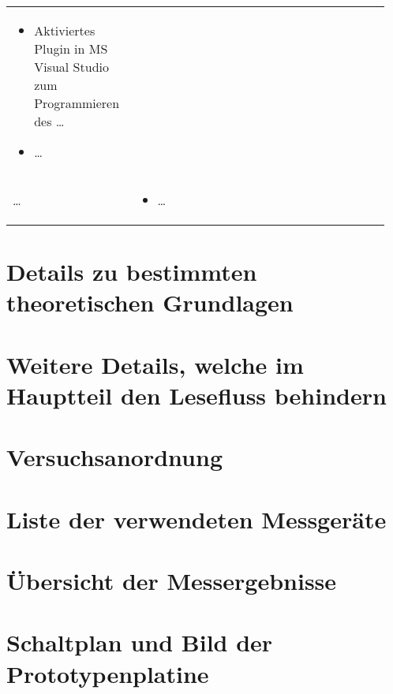 \begin{table}[hbt]
\begin{tabular}{>{\raggedright\arraybackslash}p{0.3\linewidth} >{\raggedright\arraybackslash}p{0.65\linewidth}}
\begin{itemize}[noitemsep,topsep=0pt,partopsep=0pt,parsep=0pt]
							\item Aktiviertes Plugin in MS Visual Studio zum Programmieren des \ldots
							\item \ldots
							\end{itemize} \\ 
		\ldots	&	\vspace{-\topsep}
					\begin{itemize}[noitemsep,topsep=0pt,partopsep=0pt,parsep=0pt] 
					\item \ldots
					\end{itemize} \\ 
		\hline 
	\end{tabular} 
\end{table}

\setcounter{chapter}{2}

\section{Details zu bestimmten theoretischen Grundlagen}

\section{Weitere Details, welche im Hauptteil den Lesefluss behindern}

\setcounter{chapter}{3}
\setcounter{section}{0}
\setcounter{table}{0}
\setcounter{figure}{0}

\section{Versuchsanordnung}

\section{Liste der verwendeten Messgeräte}

\section{Übersicht der Messergebnisse}

\section{Schaltplan und Bild der Prototypenplatine}

\setcounter{chapter}{4}
\setcounter{section}{0}
\setcounter{table}{0}
\setcounter{figure}{0}

